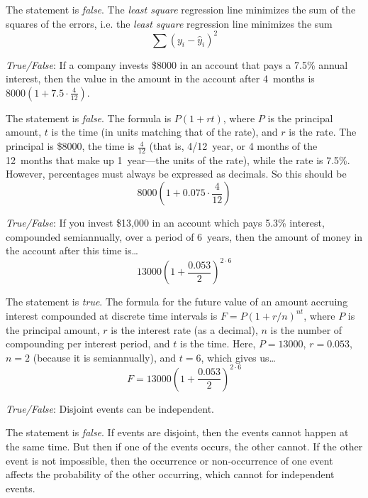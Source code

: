 \documentclass[11pt,letterpaper]{article}
\begin{document}
\sol The statement is \textit{false}. The \textit{least square} regression line minimizes the sum of the squares of the errors, i.e. the \textit{least square} regression line minimizes the sum
	\[
	\sum (y_i - \widehat{y}_i)^2 
	\] \pvspace{1cm}



\quizsol \textit{True/False}: If a company invests \$8000 in an account that pays a 7.5\% annual interest, then the value in the amount in the account after 4~months is $8000 \left(1 + 7.5 \cdot \frac{4}{12} \right)$. \pspace

\sol The statement is \textit{false}. The formula is $P (1 + rt)$, where $P$ is the principal amount, $t$ is the time (in units matching that of the rate), and $r$ is the rate. The principal is \$8000, the time is $\frac{4}{12}$ (that is, 4/12~year, or 4 months of the 12~months that make up 1~year---the units of the rate), while the rate is 7.5\%. However, percentages must always be expressed as decimals. So this should be
	\[
	8000 \left(1 + 0.075 \cdot \frac{4}{12} \right)
	\]


\quizsol \textit{True/False}: If you invest \$13,000 in an account which pays 5.3\% interest, compounded semiannually, over a period of 6~years, then the amount of money in the account after this time is\dots
	\[
	13000 \left(1 + \dfrac{0.053}{2} \right)^{2 \cdot 6}
	\] \pspace

\sol The statement is \textit{true}. The formula for the future value of an amount accruing interest compounded at discrete time intervals is $F= P (1 + r/n)^{nt}$, where $P$ is the principal amount, $r$ is the interest rate (as a decimal), $n$ is the number of compounding per interest period, and $t$ is the time. Here, $P= 13000$, $r= 0.053$, $n= 2$ (because it is semiannually), and $t= 6$, which gives us\dots
	\[
	F= 13000 \left(1 + \dfrac{0.053}{2} \right)^{2 \cdot 6}
	\] \pvspace{1.5cm}



\quizsol \textit{True/False}: Disjoint events can be independent. \pspace

\sol The statement is \textit{false}. If events are disjoint, then the events cannot happen at the same time. But then if one of the events occurs, the other cannot. If the other event is not impossible, then the occurrence or non-occurrence of one event affects the probability of the other occurring, which cannot for independent events. \pvspace{1.5cm}
\end{document}
